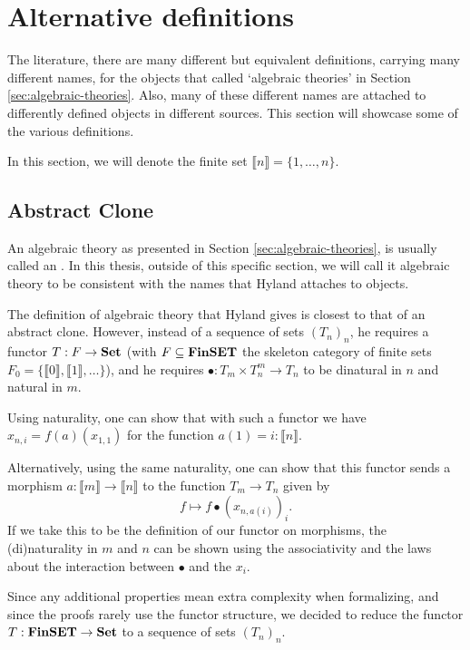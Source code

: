 \chapter{Alternative definitions}
The literature, there are many different but equivalent definitions, carrying many different names, for the objects that called `algebraic theories' in Section \ref{sec:algebraic-theories}. Also, many of these different names are attached to differently defined objects in different sources. This section will showcase some of the various definitions.

In this section, we will denote the finite set $ \llbracket n \rrbracket = \{ 1, \dots, n \} $.

\section{Abstract Clone}
\begin{definition}
  An algebraic theory as presented in Section \ref{sec:algebraic-theories}, is usually called an . In this thesis, outside of this specific section, we will call it algebraic theory to be consistent with the names that Hyland attaches to objects.
\end{definition}

\begin{remark}
  The definition of algebraic theory that Hyland gives is closest to that of an abstract clone. However, instead of a sequence of sets $ (T_n)_n $, he requires a functor $ T: F \to \mathbf{Set} $ (with $ F \subseteq \mathbf{FinSET} $ the skeleton category of finite sets $ F_0 = \{ \llbracket 0 \rrbracket, \llbracket 1 \rrbracket, \dots \} $), and he requires $ \bullet: T_m \times T_n^m \to T_n $ to be dinatural in $ n $ and natural in $ m $.

  Using naturality, one can show that with such a functor we have $ x_{n, i} = f(a)(x_{1, 1}) $ for the function $ a(1) = i : \llbracket n \rrbracket $.

  Alternatively, using the same naturality, one can show that this functor sends a morphism $ a: \llbracket m \rrbracket \to \llbracket n \rrbracket $ to the function $ T_m \to T_n $ given by
  \[ f \mapsto f \bullet (x_{n, a(i)})_i. \]
  If we take this to be the definition of our functor on morphisms, the (di)naturality in $ m $ and $ n $ can be shown using the associativity and the laws about the interaction between $ \bullet $ and the $ x_i $.

  Since any additional properties mean extra complexity when formalizing, and since the proofs rarely use the functor structure, we decided to reduce the functor $ T: \mathbf{FinSET} \to \mathbf{Set} $ to a sequence of sets $ (T_n)_n $.
\end{remark}


